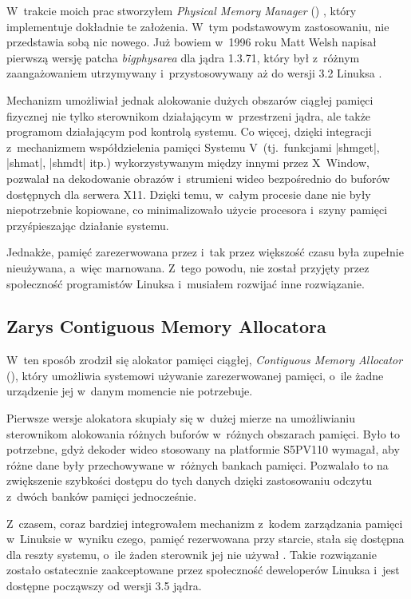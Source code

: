 W~trakcie moich prac stworzyłem \textit{Physical Memory Manager} ()
\autocite{patch:pmm}, który implementuje dokładnie te założenia. W~tym
podstawowym zastosowaniu,  nie przedstawia sobą nic nowego.  Już
bowiem w~1996 roku Matt Welsh napisał pierwszą wersję patcha
\emph{bigphysarea} dla jądra 1.3.71, który był z~różnym zaangażowaniem
utrzymywany i~przystosowywany aż do wersji 3.2 Linuksa
\autocite{patch:bigphys}.

Mechanizm  umożliwiał jednak alokowanie dużych obszarów
ciągłej pamięci fizycznej nie tylko sterownikom działającym
w~przestrzeni jądra, ale także programom działającym pod kontrolą
systemu. Co więcej, dzięki integracji z~mechanizmem współdzielenia
pamięci Systemu V~(tj.\ funkcjami \code|shmget|, \code|shmat|,
\code|shmdt| itp.)  wykorzystywanym między innymi przez X~Window,
 pozwalał na dekodowanie obrazów i~strumieni wideo
bezpośrednio do buforów dostępnych dla serwera X11.  Dzięki temu,
w~całym procesie dane nie były niepotrzebnie kopiowane, co
minimalizowało użycie procesora i~szyny pamięci przyśpieszając
działanie systemu.

Jednakże, pamięć zarezerwowana przez  i~tak przez większość czasu
była zupełnie nieużywana, a~więc marnowana.  Z~tego powodu,  nie
został przyjęty przez społeczność programistów Linuksa i~musiałem
rozwijać inne rozwiązanie.

\subsection{Zarys Contiguous Memory Allocatora}

W~ten sposób zrodził się alokator pamięci ciągłej, \textit{Contiguous
  Memory Allocator} (), który umożliwia systemowi używanie
zarezerwowanej pamięci, o~ile żadne urządzenie jej w~danym momencie
nie potrzebuje.

Pierwsze wersje alokatora  skupiały się w~dużej mierze na
umożliwianiu sterownikom alokowania różnych buforów w~różnych
obszarach pamięci.  Było to potrzebne, gdyż dekoder wideo stosowany na
platformie S5PV110 wymagał, aby różne dane były przechowywane
w~różnych bankach pamięci.  Pozwalało to na zwiększenie szybkości
dostępu do tych danych dzięki zastosowaniu odczytu z~dwóch banków
pamięci jednocześnie.

Z~czasem, coraz bardziej integrowałem mechanizm  z~kodem
zarządzania pamięci w~Linuksie w~wyniku czego, pamięć rezerwowana przy
starcie, stała się dostępna dla reszty systemu, o~ile żaden sterownik
jej nie używał \autocite{patch:cma-24}.  Takie rozwiązanie zostało
ostatecznie zaakceptowane przez społeczność deweloperów Linuksa i~jest
dostępne począwszy od wersji 3.5 jądra.
